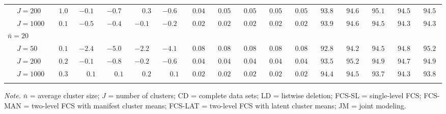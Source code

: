 \begin{sidewaystable}
\begin{threeparttable}
\begin{tabular}{llccccccccccccccc}
 & \nopagebreak $\;J=200$  & $\phantom{-}1.0\phantom{0}$ & ${-}0.1\phantom{0}$ & ${-}0.7\phantom{0}$ & $\phantom{-}0.3\phantom{0}$ & ${-}0.6\phantom{0}$ & $\phantom{0}0.04\phantom{0}$ & $\phantom{0}0.05\phantom{0}$ & $\phantom{0}0.05\phantom{0}$ & $\phantom{0}0.05\phantom{0}$ & $\phantom{0}0.05\phantom{0}$ & $\phantom{0}93.8\phantom{0}$ & $\phantom{0}94.6\phantom{0}$ & $\phantom{0}95.1\phantom{0}$ & $\phantom{0}94.5\phantom{0}$ & $\phantom{0}94.5\phantom{0}$ \\
 & \nopagebreak $\;J=1000$  & $\phantom{-}0.1\phantom{0}$ & ${-}0.5\phantom{0}$ & ${-}0.4\phantom{0}$ & ${-}0.1\phantom{0}$ & ${-}0.2\phantom{0}$ & $\phantom{0}0.02\phantom{0}$ & $\phantom{0}0.02\phantom{0}$ & $\phantom{0}0.02\phantom{0}$ & $\phantom{0}0.02\phantom{0}$ & $\phantom{0}0.02\phantom{0}$ & $\phantom{0}93.9\phantom{0}$ & $\phantom{0}94.6\phantom{0}$ & $\phantom{0}94.5\phantom{0}$ & $\phantom{0}94.3\phantom{0}$ & $\phantom{0}94.3\phantom{0}$ \\
\multicolumn{4}{l}{$\bar{n}=20$} \\  & \nopagebreak $\;J=50$  & $\phantom{-}0.1\phantom{0}$ & ${-}2.4\phantom{0}$ & ${-}5.0\phantom{0}$ & ${-}2.2\phantom{0}$ & ${-}4.1\phantom{0}$ & $\phantom{0}0.08\phantom{0}$ & $\phantom{0}0.08\phantom{0}$ & $\phantom{0}0.08\phantom{0}$ & $\phantom{0}0.08\phantom{0}$ & $\phantom{0}0.08\phantom{0}$ & $\phantom{0}92.8\phantom{0}$ & $\phantom{0}94.2\phantom{0}$ & $\phantom{0}94.5\phantom{0}$ & $\phantom{0}94.8\phantom{0}$ & $\phantom{0}95.2\phantom{0}$ \\
 & \nopagebreak $\;J=200$  & $\phantom{-}0.2\phantom{0}$ & ${-}0.1\phantom{0}$ & ${-}0.8\phantom{0}$ & ${-}0.2\phantom{0}$ & ${-}0.6\phantom{0}$ & $\phantom{0}0.04\phantom{0}$ & $\phantom{0}0.04\phantom{0}$ & $\phantom{0}0.04\phantom{0}$ & $\phantom{0}0.04\phantom{0}$ & $\phantom{0}0.04\phantom{0}$ & $\phantom{0}93.5\phantom{0}$ & $\phantom{0}95.2\phantom{0}$ & $\phantom{0}94.9\phantom{0}$ & $\phantom{0}94.7\phantom{0}$ & $\phantom{0}94.9\phantom{0}$ \\
 & \nopagebreak $\;J=1000$  & $\phantom{-}0.3\phantom{0}$ & $\phantom{-}0.1\phantom{0}$ & $\phantom{-}0.1\phantom{0}$ & $\phantom{-}0.2\phantom{0}$ & $\phantom{-}0.1\phantom{0}$ & $\phantom{0}0.02\phantom{0}$ & $\phantom{0}0.02\phantom{0}$ & $\phantom{0}0.02\phantom{0}$ & $\phantom{0}0.02\phantom{0}$ & $\phantom{0}0.02\phantom{0}$ & $\phantom{0}94.4\phantom{0}$ & $\phantom{0}94.5\phantom{0}$ & $\phantom{0}93.7\phantom{0}$ & $\phantom{0}94.3\phantom{0}$ & $\phantom{0}93.8\phantom{0}$ \\
[0.5ex]\hline\\[-1.6ex] 
\end{tabular}
\begin{tablenotes}{\footnotesize \textit{Note.} $\bar{n}$ = average cluster size; $J$ = number of clusters; CD = complete data sets; LD = listwise deletion; FCS-SL = single-level FCS; FCS-MAN = two-level FCS with manifest cluster means; FCS-LAT = two-level FCS with latent cluster means; JM = joint modeling.}\end{tablenotes}
\end{threeparttable}
\end{sidewaystable}
